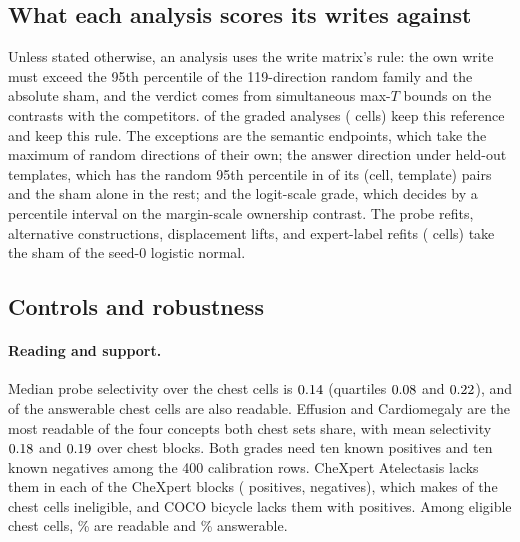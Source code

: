 \documentclass{article}
\begin{document}
\subsection{What each analysis scores its writes against}
\label{app:cf-ledger}

Unless stated otherwise, an analysis uses the write matrix's rule: the own write must exceed the 95th percentile of the 119-direction random family and the absolute sham, and the verdict comes from simultaneous max-$T$ bounds on the contrasts with the competitors. \cfLedgerFullReference{} of the \cfLedgerAnalyses{} graded analyses (\cfLedgerCells{} cells) keep this reference and \cfLedgerMaxT{} keep this rule. The exceptions are the semantic endpoints, which take the maximum of \cfSemLedgerRandom{} random directions of their own; the answer direction under held-out templates, which has the random 95th percentile in \cfAnsdirtRefPairs{} of its \cfAnsdirtLedgerPairs{} (cell, template) pairs and the sham alone in the rest; and the logit-scale grade, which decides by a percentile interval on the margin-scale ownership contrast. The probe refits, alternative constructions, displacement lifts, and expert-label refits (\cfLedgerSeedShamCells{} cells) take the sham of the seed-0 logistic normal.

\subsection{Controls and robustness}
\label{app:cf-robustness}

\paragraph{Reading and support.} Median probe selectivity over the chest cells is $0.14$ (quartiles $0.08$ and $0.22$), and \cfReadAns{} of the \cfChestAnswerable{} answerable chest cells are also readable. Effusion and Cardiomegaly are the most readable of the four concepts both chest sets share, with mean selectivity $0.18$ and $0.19$ over \cfChestProbeBlocks{} chest blocks. Both grades need ten known positives and ten known negatives among the 400 calibration rows. CheXpert Atelectasis lacks them in each of the \cfSupportInelChexBlocks{} CheXpert blocks (\cfCalChexInelPos{} positives, \cfCalChexInelNeg{} negatives), which makes \cfSupportInelChest{} of the \cfChestCellsN{} chest cells ineligible, and COCO bicycle lacks them with \cfCalCocoInelPos{} positives. Among eligible chest cells, \cfSupportReadablePctChest\% are readable and \cfSupportAnswerablePctChest\% answerable.
\end{document}
